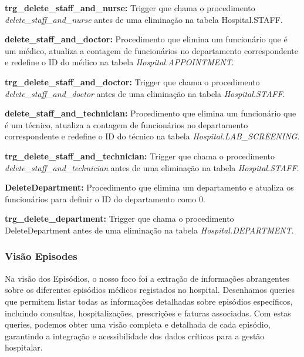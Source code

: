 \vspace{0.15cm}
\textbf{trg\_delete\_staff\_and\_nurse:} Trigger que chama o procedimento \textit{delete\_staff\_and\_nurse} antes de uma eliminação na tabela Hospital.STAFF.

\vspace{0.15cm}
\textbf{delete\_staff\_and\_doctor:} Procedimento que elimina um funcionário que é um médico, atualiza a contagem de funcionários no departamento correspondente e redefine o ID do médico na tabela \textit{Hospital.APPOINTMENT}.

\vspace{0.15cm}
\textbf{trg\_delete\_staff\_and\_doctor:} Trigger que chama o procedimento \textit{delete\_staff\_and\_doctor} antes de uma eliminação na tabela \textit{Hospital.STAFF}.

\vspace{0.15cm}
\textbf{delete\_staff\_and\_technician:} Procedimento que elimina um funcionário que é um técnico, atualiza a contagem de funcionários no departamento correspondente e redefine o ID do técnico na tabela \textit{Hospital.LAB\_SCREENING}.

\vspace{0.15cm}
\textbf{trg\_delete\_staff\_and\_technician:} Trigger que chama o procedimento \textit{delete\_staff\_and\_technician} antes de uma eliminação na tabela \textit{Hospital.STAFF}.

\vspace{0.15cm}
\textbf{DeleteDepartment:} Procedimento que elimina um departamento e atualiza os funcionários para definir o ID do departamento como 0.

\vspace{0.15cm}
\textbf{trg\_delete\_department:} Trigger que chama o procedimento DeleteDepartment antes de uma eliminação na tabela \textit{Hospital.DEPARTMENT}.

\subsubsection{Visão Episodes}

Na visão dos Episódios, o nosso foco foi a extração de informações abrangentes sobre os diferentes episódios médicos registados no hospital. Desenhamos queries que permitem listar todas as informações detalhadas sobre episódios específicos, incluindo consultas, hospitalizações, prescrições e faturas associadas. Com estas queries, podemos obter uma visão completa e detalhada de cada episódio, garantindo a integração e acessibilidade dos dados críticos para a gestão hospitalar.


